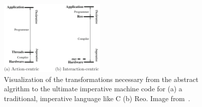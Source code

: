 \begin{figure}
\centering
\includegraphics[page=1, width=0.46\textwidth]{images/actInter.png}
\caption[]{Visualization of the transformations necessary from the abstract algrithm to the ultimate imperative machine code for (a) a traditional, imperative language like C (b) Reo. Image from~\cite{proper}.}
\label{fig:actInter}
\end{figure}




